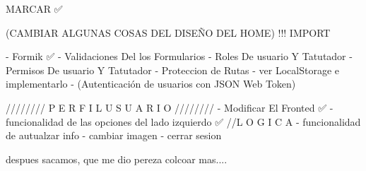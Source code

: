 
MARCAR ✅

(CAMBIAR ALGUNAS COSAS DEL DISEÑO DEL HOME) !!! IMPORT 

- Formik ✅
- Validaciones Del los Formularios 
- Roles De usuario Y Tatutador
- Permisos De usuario Y Tatutador
- Proteccion de Rutas
- ver LocalStorage e implementarlo
- (Autenticación de usuarios con JSON Web Token)


////////   P E R F I L   U S U A R I O   ////////  
- Modificar El Fronted ✅
- funcionalidad de las opciones del lado izquierdo ✅
//L O G I C A
- funcionalidad de autualzar info 
- cambiar imagen
- cerrar sesion 

despues sacamos, que me dio pereza colcoar mas....


